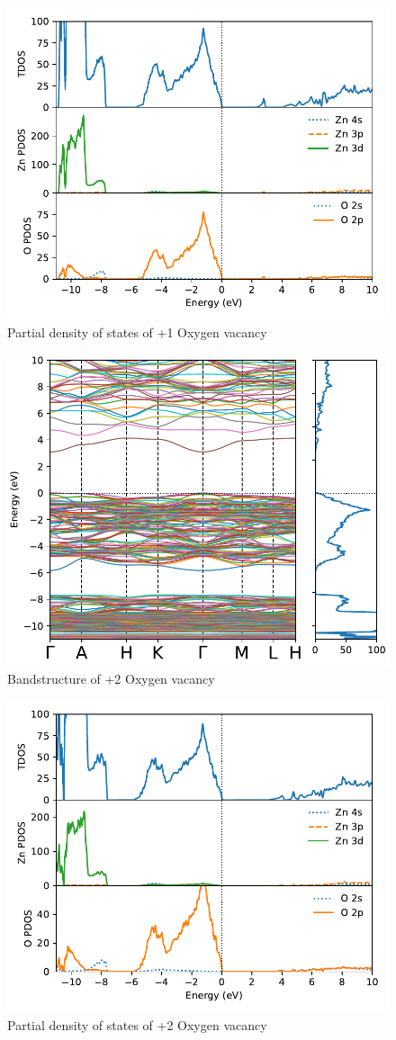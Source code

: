 \begin{figure}[tbh!]
	\centering
	\includegraphics[width=0.6\linewidth]{"images/rnd/dos-pdos_O_vac-p1"}
	\caption[Partial density of states of +1 Oxygen vacancy]{Partial density of states of +1 Oxygen vacancy}
\end{figure}

\begin{figure}[tbh!]
	\centering
	\includegraphics[width=0.6\linewidth]{"images/rnd/band-dos_O_vac-p2"}
	\caption[Bandstructure of +2 Oxygen vacancy]{Bandstructure of +2 Oxygen vacancy}
\end{figure}

\begin{figure}[tbh!]
	\centering
	\includegraphics[width=0.6\linewidth]{"images/rnd/dos-pdos_O_vac-p2"}
	\caption[Partial density of states of +2 Oxygen vacancy]{Partial density of states of +2 Oxygen vacancy}
\end{figure}

